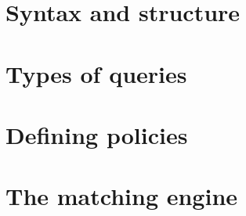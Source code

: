 \section{Syntax and structure}
\section{Types of queries}
\section{Defining policies}
\section{The matching engine} 
\label{subsec:matchingEngine} %
